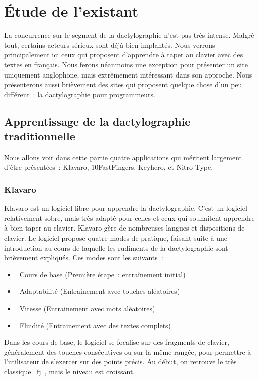 \documentclass[a4paper,12pt]{article}
\begin{document}
\section{Étude de l'existant}

La concurrence sur le segment de la dactylographie n'est pas très intense. Malgré tout, certains acteurs sérieux sont déjà bien implantés. Nous verrons principalement ici ceux qui proposent d'apprendre à taper au clavier avec des textes en français. Nous ferons néanmoins une exception pour présenter un site uniquement anglophone, mais extrêmement intéressant dans son approche. Nous présenterons aussi brièvement des sites qui proposent quelque chose d'un peu différent~: la dactylographie pour programmeurs.

\subsection{Apprentissage de la dactylographie traditionnelle}

Nous allons voir dans cette partie quatre applications qui méritent largement d'être présentées~: Klavaro, 10FastFingers, Keyhero, et Nitro Type.

\subsubsection{Klavaro}

Klavaro est un logiciel libre pour apprendre la dactylographie. C'est un logiciel relativement sobre, mais très adapté pour celles et ceux qui souhaitent apprendre à bien taper au clavier. Klavaro gère de nombreuses langues et dispositions de clavier. Le logiciel propose quatre modes de pratique, faisant suite à une introduction au cours de laquelle les rudiments de la dactylographie sont brièvement expliqués. Ces modes sont les suivants~:

\begin{itemize}
 \item{\og~Cours de base (Première étape~: entraînement initial)~\fg}
 \item{\og~Adaptabilité (Entrainement avec touches aléatoires)~\fg}
 \item{\og~Vitesse (Entrainement avec mots aléatoires)~\fg}
 \item{\og~Fluidité (Entrainement avec des textes complets)~\fg}
\end{itemize}

Dans les cours de base, le logiciel se focalise sur des fragments de clavier, généralement des touches consécutives ou sur la même rangée, pour permettre à l'utilisateur de s'exercer sur des points précis. Au début, on retrouve le très classique \og~fj~\fg, mais le niveau est croissant.
\end{document}
